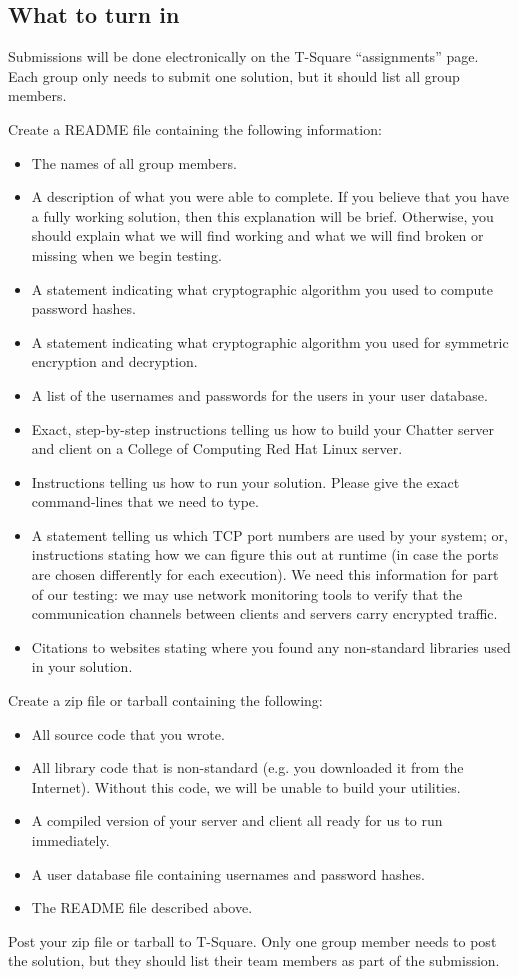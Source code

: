 \documentclass[letterpaper]{article}
\begin{document}
\subsection*{What to turn in}

Submissions will be done electronically on the T-Square “assignments” page. Each
group only needs to submit one solution, but it should list all group members.

Create a README file containing the following information:
\begin{itemize}
\item The names of all group members.
\item A description of what you were able to complete. If you believe that you have
a fully working solution, then this explanation will be brief. Otherwise, you
should explain what we will find working and what we will find broken or
missing when we begin testing.
\item A statement indicating what cryptographic algorithm you used to compute
password hashes.
\item A statement indicating what cryptographic algorithm you used for symmetric
encryption and decryption.
\item A list of the usernames and passwords for the users in your user database.
\item Exact, step-by-step instructions telling us how to build your Chatter server
and client on a College of Computing Red Hat Linux server.
\item Instructions telling us how to run your solution. Please give the exact
command-lines that we need to type.
\item A statement telling us which TCP port numbers are used by your system; or,
instructions stating how we can figure this out at runtime (in case the ports
are chosen differently for each execution). We need this information for part
of our testing: we may use network monitoring tools to verify that the
communication channels between clients and servers carry encrypted traffic.
\item Citations to websites stating where you found any non-standard libraries
used in your solution.
\end{itemize}
Create a zip file or tarball containing the following:
\begin{itemize}
\item All source code that you wrote.
\item All library code that is non-standard (e.g. you downloaded it from the
Internet). Without this code, we will be unable to build your utilities.
\item A compiled version of your server and client all ready for us to run
immediately.
\item A user database file containing usernames and password hashes.
\item The README file described above.
\end{itemize}
Post your zip file or tarball to T-Square. Only one group member needs to post the
solution, but they should list their team members as part of the submission.
\end{document}
